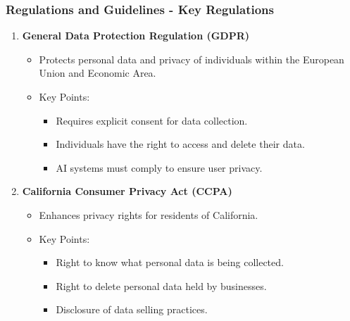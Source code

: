 \documentclass[aspectratio=169]{beamer}
\begin{document}
\begin{frame}[fragile]
    \frametitle{Regulations and Guidelines - Key Regulations}
    \begin{enumerate}
        \item \textbf{General Data Protection Regulation (GDPR)}
        \begin{itemize}
            \item Protects personal data and privacy of individuals within the European Union and Economic Area.
            \item Key Points:
            \begin{itemize}
                \item Requires explicit consent for data collection.
                \item Individuals have the right to access and delete their data.
                \item AI systems must comply to ensure user privacy.
            \end{itemize}
        \end{itemize}

        \item \textbf{California Consumer Privacy Act (CCPA)}
        \begin{itemize}
            \item Enhances privacy rights for residents of California.
            \item Key Points:
            \begin{itemize}
                \item Right to know what personal data is being collected.
                \item Right to delete personal data held by businesses.
                \item Disclosure of data selling practices.
            \end{itemize}
        \end{itemize}
    \end{enumerate}
\end{frame}
\end{document}
